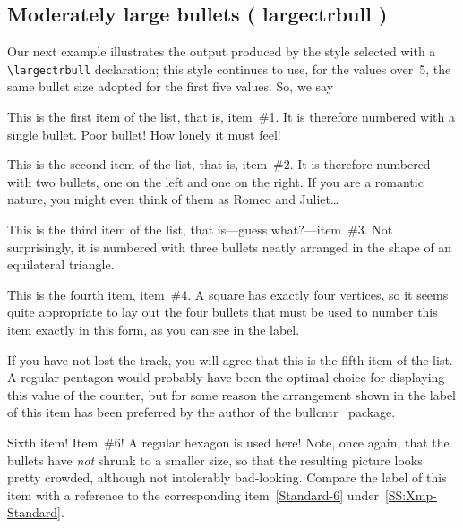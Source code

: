 \documentclass[a4paper]{article}
\DeclareRobustCommand*{\command}[1]{%
	{\texorpdfstring{\normalfont\ttfamily \char\escapechar}{\pdfbslash}#1}%
}
\DeclareRobustCommand*{\packlass}[1]{%
	{\texorpdfstring{\normalfont \sffamily}{}#1}%
}
\newcommand*{\Bullcntr}{bullcntr}
\newcommand*{\bull}{\packlass{\Bullcntr}}
\newcommand*{\tbull}{the \bull\ package}
\newcommand*{\pdfbslash}{}
{\catcode`\|=0 |catcode`|\=12 |gdef|pdfbslash{\\}}
\begin{document}
\subsection{Moderately large bullets (\command{largectrbull})}

Our next example illustrates the output produced by the style selected
with a \verb|\largectrbull| declaration; this style continues to use,
for the values over~5, the same bullet size adopted for the first five
values.  So, we say

\begin{bullenum}
	\largectrbull

	\item
		This is the first item of the list, that is, item~\#1.  It is
		therefore numbered with a single bullet.  Poor bullet!  How
		lonely it must feel!

	\item
		This is the second item of the list, that is, item~\#2.  It is
		therefore numbered with two bullets, one on the left and one
		on the right.  If you are a romantic nature, you might even
		think of them as Romeo and Juliet\ldots

	\item\label{Large-3}
		This is the third item of the list, that is---guess
		what?---item~\#3.  Not surprisingly, it is numbered with three
		bullets neatly arranged in the shape of an equilateral
		triangle.

	\item
		This is the fourth item, item~\#4.  A square has exactly four
		vertices, so it seems quite appropriate to lay out the four
		bullets that must be used to number this item exactly in this
		form, as you can see in the label.

	\item
		If you have not lost the track, you will agree that this is
		the fifth item of the list.  A regular pentagon would probably
		have been the optimal choice for displaying this value of the
		counter, but for some reason the arrangement shown in the
		label of this item has been preferred by the author of \tbull.

	\item\label{Large-6}
		Sixth item!  Item~\#6!  A regular hexagon is used here!  Note,
		once again, that the bullets have \emph{not} shrunk to a
		smaller size, so that the resulting picture looks pretty
		crowded, although not intolerably bad-looking.  Compare the
		label of this item with a reference to the corresponding
		item~\ref{Standard-6} under~\ref{SS:Xmp-Standard}.


\end{bullenum}
\end{document}
